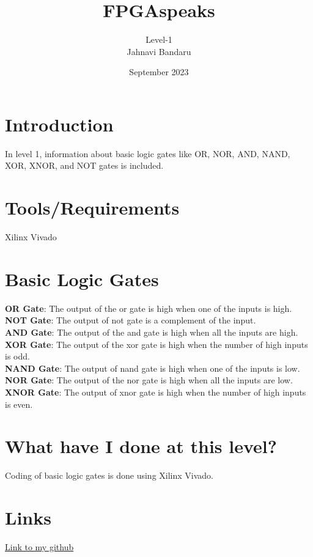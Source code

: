 \documentclass{article}
\title{\textbf{FPGAspeaks}}
\author{Level-1\\Jahnavi Bandaru}
\date{September 2023}
\begin{document}
\maketitle
\tableofcontents
\section{Introduction}
In level 1, information about basic logic gates like OR, NOR, AND, NAND, XOR, XNOR, and NOT gates is included.
\section{Tools/Requirements}
Xilinx Vivado
\section{Basic Logic Gates}
\textbf{OR Gate}: The output of the or gate is high when one of the inputs is high.\\
\textbf{NOT Gate}: The output of not gate is a complement of the input.\\
\textbf{AND Gate}: The output of the and gate is high when all the inputs are high.\\
\textbf{XOR Gate}: The output of the xor gate is high  when the number of high inputs is odd.\\
\textbf{NAND Gate}: The output of nand gate is high when one of the inputs is low.\\
\textbf{NOR Gate}: The output of the nor gate is high when all the inputs are low.\\
\textbf{XNOR Gate}: The output of xnor gate is high when the number of high inputs is even.

\section{What have I done at this level?}
Coding of basic logic gates is done using Xilinx Vivado.
\section{Links}
\href{https://github.com/jahnavi-bandaru/FPGAspeaks/tree/main/Level%201}{Link to my github}
\end{document}
